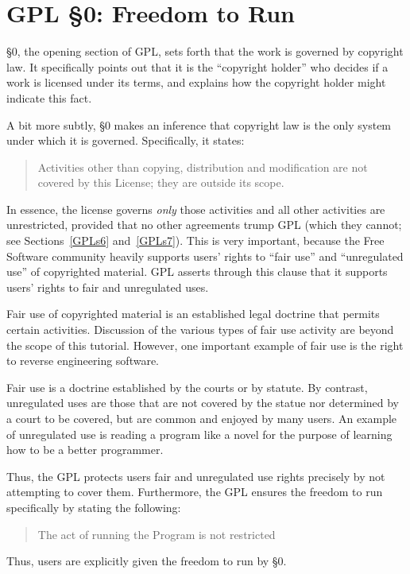 \documentclass[12pt]{report}
\begin{document}
\section{GPL \S 0: Freedom to Run}

\S 0, the opening section of GPL, sets forth that the work is governed by
copyright law.  It specifically points out that it is the ``copyright
holder'' who decides if a work is licensed under its terms, and explains
how the copyright holder might indicate this fact.

A bit more subtly, \S 0 makes an inference that copyright law is the only
system under which it is governed.  Specifically, it states:
\begin{quote}
Activities other than copying, distribution and modification are not
covered by this License; they are outside its scope.
\end{quote}
In essence, the license governs \emph{only} those activities and all other
activities are unrestricted, provided that no other agreements trump GPL
(which they cannot; see Sections~\ref{GPLs6} and~\ref{GPLs7}).  This is
very important, because the Free Software community heavily supports
users' rights to ``fair use'' and ``unregulated use'' of copyrighted
material.  GPL asserts through this clause that it supports users' rights
to fair and unregulated uses.

Fair use of copyrighted material is an established legal doctrine that
permits certain activities.  Discussion of the various types of fair use
activity are beyond the scope of this tutorial.  However, one important
example of fair use is the right to reverse engineering software.

Fair use is a doctrine established by the courts or by statute.  By
contrast, unregulated uses are those that are not covered by the statue
nor determined by a court to be covered, but are common and enjoyed by
many users.  An example of unregulated use is reading a program like a
novel for the purpose of learning how to be a better programmer.

\medskip

Thus, the GPL protects users fair and unregulated use rights precisely by
not attempting to cover them.  Furthermore, the GPL ensures the freedom
to run specifically by stating the following:
\begin{quote}
The act of running the Program is not restricted
\end{quote}
Thus, users are explicitly given the freedom to run by \S 0.
\end{document}

